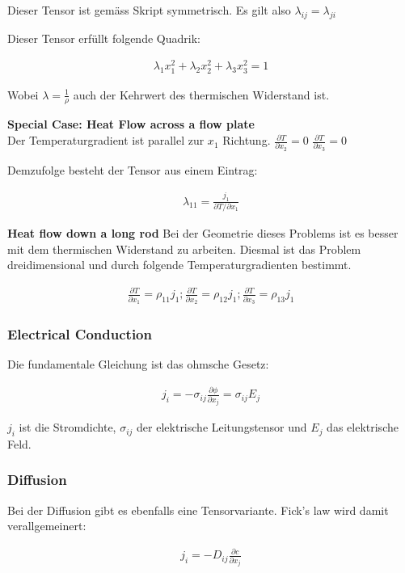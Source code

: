 \documentclass[a4paper]{scrartcl}
\begin{document}
Dieser Tensor ist gemäss Skript symmetrisch. Es gilt also
$\lambda_{ij}=\lambda_{ji}$

Dieser Tensor erfüllt folgende Quadrik:

\begin{align}
\lambda_1 x_1^2+\lambda_2 x_2^2+\lambda_3 x_3^2=1
\end{align}

Wobei $\lambda=\frac{1}{\rho}$ auch der Kehrwert des thermischen Widerstand ist.

\textbf{Special Case: Heat Flow across a flow plate} \\
Der Temperaturgradient ist parallel zur $x_1$ Richtung. $\frac{\partial
T}{\partial x_2}=0$ $\frac{\partial T}{\partial x_3}=0$

Demzufolge besteht der Tensor aus einem Eintrag:

\begin{align}
\lambda_{11}=\frac{j_1}{\partial T/ \partial x_1}
\end{align}

\textbf{Heat flow down a long rod}
Bei der Geometrie dieses Problems ist es besser mit dem thermischen Widerstand
zu arbeiten. Diesmal ist das Problem dreidimensional und durch folgende
Temperaturgradienten bestimmt.

\begin{align}
\frac{\partial T}{\partial x_1}=\rho_{11}j_1; \frac{\partial T}{\partial
x_2}=\rho_{12}j_1; \frac{\partial T}{\partial x_3}=\rho_{13}j_1
\end{align}

\subsubsection{Electrical Conduction}
Die fundamentale Gleichung ist das ohmsche Gesetz:

\begin{align}
j_i=-\sigma_{ij}\frac{\partial \phi}{\partial x_j}=\sigma_{ij}E_j
\end{align}

$j_i$ ist die Stromdichte, $\sigma_{ij}$ der elektrische Leitungstensor und
$E_j$ das elektrische Feld.

\subsubsection{Diffusion}
Bei der Diffusion gibt es ebenfalls eine Tensorvariante. Fick's law wird damit
verallgemeinert:

\begin{align}
j_i=-D_{ij}\frac{\partial c}{\partial x_j}
\end{align}
\end{document}
